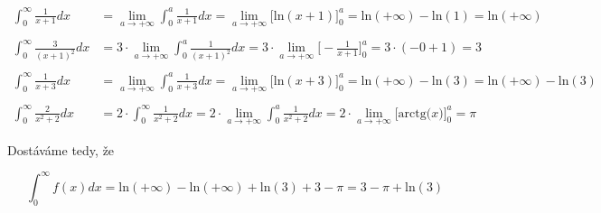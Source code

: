 \begin{align*}
\int_{0}^{\infty} \frac{1}{x+1} dx \quad &= \lim_{a \rightarrow +\infty}\int_{0}^{a} \frac{1}{x+1} dx =  \lim_{a \rightarrow + \infty}\big[\mbox{ln}(x + 1)\big]_0^a = \mbox{ln}(+\infty) - \mbox{ln}(1) = \mbox{ln}(+\infty)\nonumber \\ \quad \nonumber\\
\int_{0}^{\infty} \frac{3}{(x+1)^2} dx &= 3 \cdot \lim_{a \rightarrow +\infty}\int_{0}^{a} \frac{1}{(x + 1)^2} dx = 3 \cdot \lim_{a \rightarrow +\infty} \Big[ -\frac{1}{x+1}\Big]^a_0 = 3 \cdot(-0 + 1) = 3 \nonumber \\ \quad \nonumber\\
\int_{0}^{\infty} \frac{1}{x+3} dx \quad \, &= \lim_{a \rightarrow +\infty}\int_{0}^{a} \frac{1}{x+3}dx = \lim_{a \rightarrow +\infty}\big[\mbox{ln}(x + 3)\big]_0^a = \mbox{ln}(+\infty) - \mbox{ln}(3) = \mbox{ln}(+\infty) - \mbox{ln}(3)\nonumber \\ \quad \nonumber\\
\int_{0}^{\infty} \frac{2}{x^2+2} dx \quad &= 2 \cdot \int_{0}^{\infty} \frac{1}{x^2+2} dx = 2 \cdot \lim_{a \rightarrow +\infty}\int_{0}^{a} \frac{1}{x^2+2} dx = 2 \cdot \lim_{a \rightarrow +\infty} \Big[\mbox{arctg}\Big(x\Big)\Big]^a_0 = \pi\nonumber \quad \nonumber
\end{align*}

\noindent Dostáváme tedy, že

\begin{displaymath}
\int_{0}^{\infty} f(x)dx = \mbox{ln}(+\infty) - \mbox{ln}(+\infty) + \mbox{ln}(3) + 3 - \pi = 3 - \pi + \mbox{ln}(3)
\end{displaymath}





